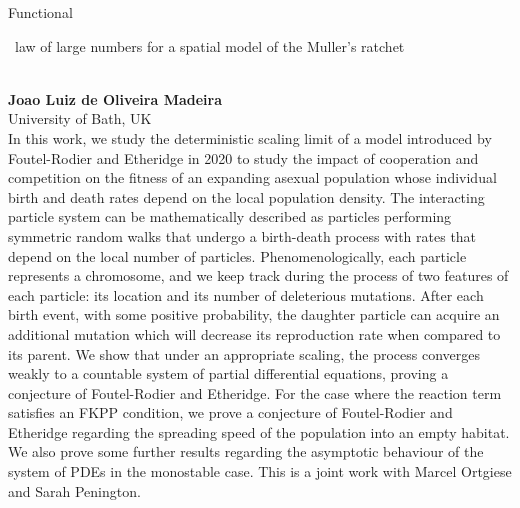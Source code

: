 \documentclass[12pt,a4paper]{article}
\newcommand{\ZAbst}{\rule[-1ex]{0pt}{2ex}\ } %
\begin{document}
\noindent
{\Large Functional\ZAbst law of large numbers for a spatial model of the Muller's ratchet}\\[1ex]
{\large 
\textbf{Joao Luiz de Oliveira  Madeira}\\[1ex] University of Bath, UK}\\[2ex]
In this work, we study the deterministic scaling limit of a model introduced by Foutel-Rodier and Etheridge in 2020 to study the impact of cooperation and competition on the fitness of an expanding asexual population whose individual birth and death rates depend on the local population density. The interacting particle system can be mathematically described as particles performing symmetric random walks that undergo a birth-death process with rates that depend on the local number of particles. Phenomenologically, each particle represents a chromosome, and we keep track during the process of two features of each particle: its location and its number of deleterious mutations.  After each birth event, with some positive probability, the daughter particle can acquire an additional mutation which will decrease its reproduction rate when compared to its parent. We show that under an appropriate scaling, the process converges weakly to a countable system of partial differential equations, proving a conjecture of Foutel-Rodier and Etheridge. For the case where the reaction term satisfies an FKPP condition, we prove a conjecture of Foutel-Rodier and Etheridge regarding the spreading speed of the population into an empty habitat. We also prove some further results regarding the asymptotic behaviour of the system of PDEs in the monostable case. This is a joint work with Marcel Ortgiese and Sarah Penington. 


\bigskip \bigskip  %
\end{document}
